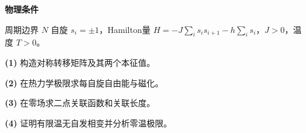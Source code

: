 \textbf{物理条件}\par 周期边界 \(N\) 自旋 \(s_i=\pm1\)，Hamilton量 \(H=-J\sum_i s_is_{i+1}-h\sum_i s_i\)，\(J>0\)，温度 \(T>0\)。
\par\noindent\textbf{(1)} 构造对称转移矩阵及其两个本征值。
\par\noindent\textbf{(2)} 在热力学极限求每自旋自由能与磁化。
\par\noindent\textbf{(3)} 在零场求二点关联函数和关联长度。
\par\noindent\textbf{(4)} 证明有限温无自发相变并分析零温极限。
